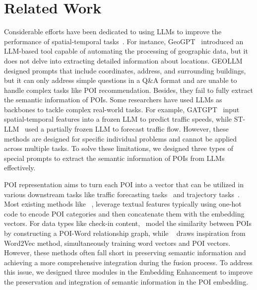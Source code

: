 \section{Related Work}
\label{sec:related}
Considerable efforts have been dedicated to using LLMs to improve the performance of spatial-temporal tasks~\cite{yu2024bigcity}. For instance, GeoGPT~\cite{geogpt} introduced an LLM-based tool capable of automating the processing of geographic data, but it does not delve into extracting detailed information about locations. GEOLLM~\cite{geollm} designed prompts that include coordinates, address, and surrounding buildings, but it can only address simple questions in a Q\&A format and are unable to handle complex tasks like POI recommendation. Besides, they fail to fully extract the semantic information of POIs.
Some researchers have used LLMs as backbones to tackle complex real-world tasks. For example, GATGPT~\cite{gatgpt} input spatial-temporal features into a frozen LLM to predict traffic speeds, while ST-LLM~\cite{stllm} used a partially frozen LLM to forecast traffic flow. However, these methods are designed for specific individual problems and cannot be applied across multiple tasks.
To solve these limitations, we designed three types of special prompts to extract the semantic information of POIs from LLMs effectively.

POI representation aims to turn each POI into a vector that can be utilized in various downstream tasks like traffic forecasting tasks~\cite{MLPST, PDFormer,stssl} and trajectory tasks~\cite{controltraj, START, gan}. Most existing methods like ~\cite{ppr}, leverage textual features typically using one-hot code to encode POI categories and then concatenate them with the embedding vectors. For data types like check-in content,~\cite{ge} model the similarity between POIs by constructing a POI-Word relationship graph, while ~\cite{cape} draws inspiration from Word2Vec method, simultaneously training word vectors and POI vectors. However, these methods often fall short in preserving semantic information and achieving a more comprehensive integration during the fusion process.
To address this issue, we designed three modules in the Embedding Enhancement to improve the preservation and integration of semantic information in the POI embedding.

